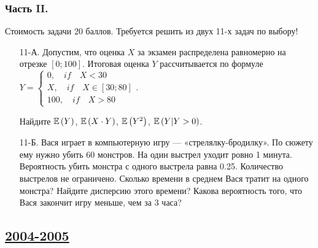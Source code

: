 \subsubsection*{Часть II.}

Стоимость задачи 20 баллов.
Требуется решить {\bf {}} из двух 11-х задач по выбору!
\begin{enumerate}
\item[11-А.] Допустим, что оценка $X$ за экзамен распределена равномерно на отрезке
$\left[0;100\right]$. Итоговая оценка $Y$ рассчитывается по формуле
$Y=\left\{\begin{array}{l} {0,\quad if\quad X<30} \\ {X,\quad if\quad X\in \left[30;80\right]} \\ {100,\quad if\quad X>80} \end{array}\right. $.

Найдите $\operatorname{\mathbb{E}}\left(Y\right)$,  $\operatorname{\mathbb{E}}\left(X\cdot Y\right)$,  $\operatorname{\mathbb{E}}\left(Y^{2} \right)$,  $\operatorname{\mathbb{E}}\left(Y|Y>0\right)$.

\item[11-Б.] Вася играет в компьютерную игру — «стрелялку-бродилку». По сюжету ему
нужно убить 60 монстров. На один выстрел уходит ровно 1 минута. Вероятность убить
монстра с одного выстрела равна 0.25. Количество выстрелов не ограничено. Сколько
времени в среднем Вася тратит на одного монстра? Найдите дисперсию этого времени?
Какова вероятность того, что Вася закончит игру меньше, чем за 3 часа?
\end{enumerate}



\newpage
\subsection[2004-2005]{\hyperref[sec:sol_kr_01_2004_2005]{2004-2005}}
\label{sec:kr_01_2004_2005}


